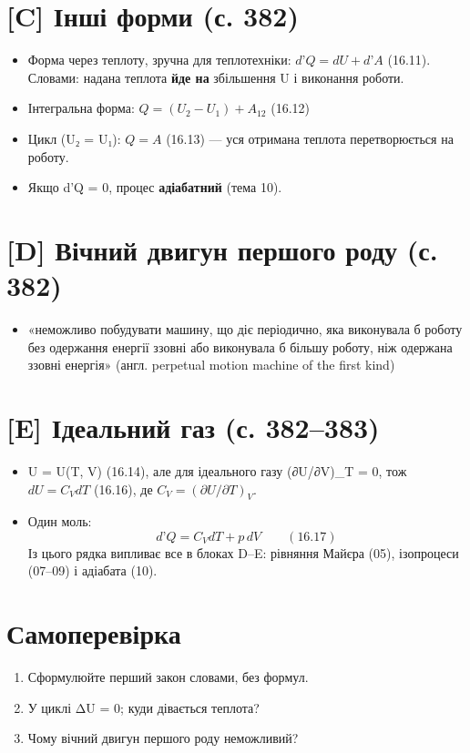 \documentclass[11pt,a4paper,oneside]{book}
\begin{document}
\section*{[C] Інші форми (с. 382)}
\begin{itemize}
\item Форма через теплоту, зручна для теплотехніки: $d\text{'}Q = dU + d\text{'}A$ (16.11). Словами: надана теплота \textbf{йде на} збільшення U і виконання роботи.
\item Інтегральна форма: $Q = (U_2 - U_1) + A_{12}$ (16.12)
\item Цикл (U₂ = U₁): $Q = A$ (16.13) — уся отримана теплота перетворюється на роботу.
\item Якщо d'Q = 0, процес \textbf{адіабатний} (тема 10).
\end{itemize}

\section*{[D] Вічний двигун першого роду (с. 382)}
\begin{itemize}
\item «неможливо побудувати машину, що діє періодично, яка виконувала б роботу без одержання енергії ззовні або виконувала б більшу роботу, ніж одержана ззовні енергія» (англ. perpetual motion machine of the first kind)
\end{itemize}

\section*{[E] Ідеальний газ (с. 382–383)}
\begin{itemize}
\item U = U(T, V) (16.14), але для ідеального газу (∂U/∂V)\_T = 0, тож $dU = C_VdT$ (16.16), де $C_V = (\partial U/\partial T)_V$.
\item Один моль:
\[d\text{'}Q = C_VdT + p\,dV\qquad(16.17)\]
Із цього рядка випливає все в блоках D–E: рівняння Майєра (05), ізопроцеси (07–09) і адіабата (10).
\end{itemize}

\section*{Самоперевірка}
\begin{enumerate}
\item Сформулюйте перший закон словами, без формул.
\item У циклі ΔU = 0; куди дівається теплота?
\item Чому вічний двигун першого роду неможливий?
\end{enumerate}
\end{document}
